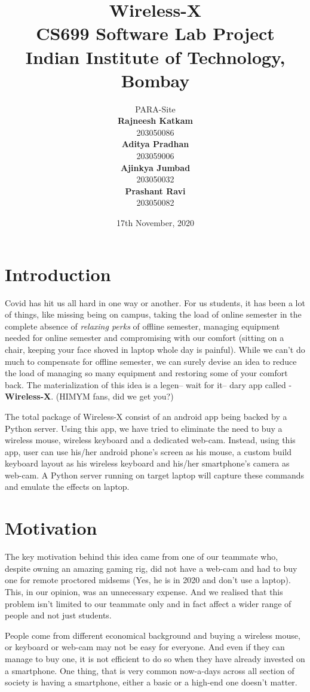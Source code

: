 \documentclass[12pt, letterpaper]{article}
\title{\textbf{\Huge Wireless-X \\
\LARGE CS699 Software Lab Project\\
\LARGE Indian Institute of Technology, Bombay}}
\date{\Large 17th November, 2020}
\author{\LARGE PARA-Site\\
\textbf{Rajneesh Katkam} \\ 203050086\\
\textbf{Aditya Pradhan} \\ 203059006\\
\textbf{Ajinkya Jumbad} \\ 203050032\\
\textbf{Prashant Ravi} \\ 203050082\\
}
\begin{document}
\maketitle
\thispagestyle{empty}
\clearpage
{}
\newpage

\tableofcontents
\newpage

\section{Introduction}
Covid has hit us all hard in one way or another. For us students, it has been a lot of things, like missing being on campus, taking the load of online semester in the complete absence of \textit{relaxing perks} of offline semester, managing equipment needed for online semester and compromising with our comfort (sitting on a chair, keeping your face shoved in laptop whole day is painful). While we can't do much to compensate for offline semester, we can surely devise an idea to reduce the load of managing so many equipment and restoring some of your comfort back. The materialization of this idea is a legen-- wait for it-- dary app called - \textbf{Wireless-X}. (HIMYM fans, did we get you?)

The total package of Wireless-X consist of an android app being backed by a Python server. Using this app, we have tried to eliminate the need to buy a wireless mouse, wireless keyboard and a dedicated web-cam. Instead, using this app, user can use his/her android phone's screen as his mouse, a custom build keyboard layout as his wireless keyboard and his/her smartphone's camera as web-cam. A Python server running on target laptop will capture these commands and emulate the effects on laptop. 

\section{Motivation}
The key motivation behind this idea came from one of our teammate who, despite owning an amazing gaming rig, did not have a web-cam and had to buy one for remote proctored midsems (Yes, he is in 2020 and don't use a laptop). This, in our opinion, was an unnecessary expense. And we realised that this problem isn't limited to our teammate only and in fact affect a wider range of people and not just students. 

People come from different economical background and buying a wireless mouse, or keyboard or web-cam may not be easy for everyone. And even if they can manage to buy one, it is not efficient to do so when they have already invested on a smartphone. One thing, that is very common now-a-days across all section of society is having a smartphone, either a basic or a high-end one doesn't matter. 
\end{document}
